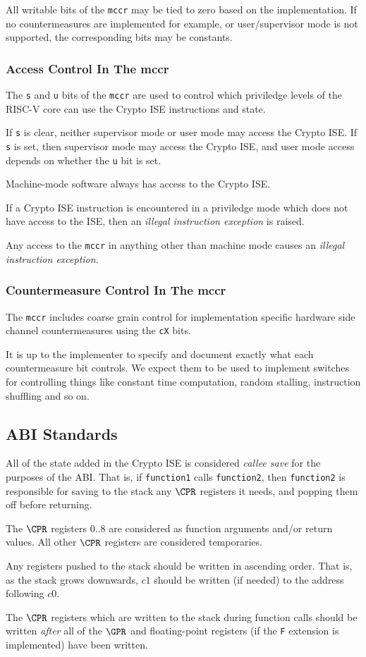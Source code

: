 All writable bits of the {\tt mccr} may be tied to zero based on the
implementation. If no countermeasures are implemented for example, or
user/supervisor mode is not supported, the corresponding bits may be
constants.

\subsubsection{Access Control In The mccr}

The {\tt s} and {\tt u} bits of the {\tt mccr} are used to control which
priviledge levels of the RISC-V core can use the Crypto ISE instructions
and state. 

If {\tt s} is clear, neither supervisor mode or user mode may access the
Crypto ISE. If {\tt s} is set, then supervisor mode may access the Crypto
ISE, and user mode access depends on whether the {\tt u} bit is set.

Machine-mode software always has access to the Crypto ISE.

If a Crypto ISE instruction is encountered in a priviledge mode which
does not have access to the ISE, then an {\em illegal instruction exception}
is raised.

Any access to the {\tt mccr} in anything other than machine mode
causes an {\em illegal instruction exception}.

\subsubsection{Countermeasure Control In The mccr}

The {\tt mccr} includes coarse grain control for implementation specific
hardware side channel countermeasures using the {\tt cX} bits.

It is up to the implementer to specify and document exactly what each
countermeasure bit controls. We expect them to be used to implement
switches for controlling things like constant time computation, random
stalling, instruction shuffling and so on.

\subsection{ABI Standards}

All of the state added in the Crypto ISE is considered {\em callee save}
for the purposes of the ABI.
That is, if {\tt function1} calls 
{\tt function2}, then {\tt function2} is responsible for saving to the
stack any $\CPR$ registers it needs, and popping them off before returning.

The $\CPR$ registers $0..8$ are considered as function arguments
and/or return values. 
All other $\CPR$ registers are considered temporaries.

Any registers pushed to the stack should be written in ascending order.
That is, as the stack grows downwards, $c1$ should be written (if needed)
to the address following $c0$.

The $\CPR$ registers which are written to the stack during function calls
should be written {\em after} all of the $\GPR$ and floating-point registers
(if the {\tt F} extension is implemented) have been written.
